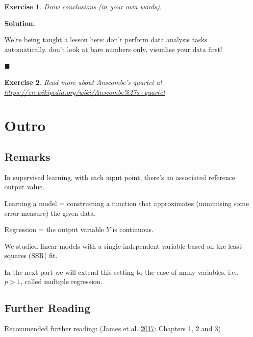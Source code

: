 \documentclass[10pt,b5paper,krantz1]{krantz}
\newtheorem{exercise}{Exercise}[chapter]
\newenvironment{solution}{%
\bigskip\noindent\textbf{Solution. }%
\it\ignorespaces%
\ignorespaces%
}{\ignorespaces%
\hfill$\blacksquare$%
}
\begin{document}
\begin{exercise}

Draw conclusions (in your own words).

\end{exercise}

\begin{solution}

We're being taught a lesson here: don't perform data analysis tasks
automatically, don't look at bare numbers only, visualise your data first!

\end{solution}

\begin{exercise}

Read more about Anscombe's quartet at \url{https://en.wikipedia.org/wiki/Anscombe\%27s_quartet}

\end{exercise}

\hypertarget{outro}{%
\section{Outro}\label{outro}}

\hypertarget{remarks}{%
\subsection{Remarks}\label{remarks}}

In supervised learning, with each input point,
there's an associated reference output value.

Learning a model = constructing a function that approximates
(minimising some error measure) the given data.

Regression = the output variable \(Y\) is continuous.

We studied linear models with a single independent variable based on
the least squares (SSR) fit.

In the next part we will extend this setting to the case
of many variables, i.e., \(p>1\), called multiple regression.

\hypertarget{further-reading}{%
\subsection{Further Reading}\label{further-reading}}

Recommended further reading: (James et al. \protect\hyperlink{ref-islr}{2017}: Chapters 1, 2 and 3)
\end{document}
